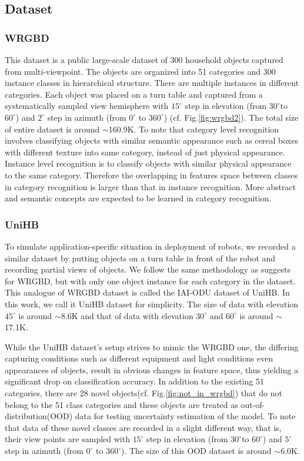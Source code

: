 \subsection{Dataset}
\subsubsection{WRGBD\cite{lai2011large}} This dataset is a public large-scale dataset of 300 household objects captured from multi-viewpoint. The objects are organized into 51 categories and 300 instance classes in hierarchical structure. There are multiple instances in different categories. Each object was placed on a turn table and captured from a systematically sampled view hemisphere with $15^{\circ}$ step in elevation (from $30^{\circ}$to $60^{\circ}$) and $2^\circ$ step in azimuth (from $0^\circ$ to $360^\circ$) (cf. Fig.\ref{fig:wrgbd2}). The total size of entire dataset is around $\sim$160.9K. To note that category level recognition involves classifying objects with similar semantic appearance such as cereal boxes with different texture into same category, instead of just physical appearance. Instance level recognition is to classify objects with similar physical appearance to the same category. Therefore the overlapping in features space between classes in category recognition is larger than that in instance recognition. More abstract and semantic concepts are expected to be learned in category recognition.  

\subsubsection{UniHB} To simulate application-specific situation in deployment of robots, we recorded a similar dataset by putting objects on a turn table in front of the robot and recording partial views of objects. We follow the same methodology as \cite{lai2011large} suggests for WRGBD, but with only one object instance for each category in the dataset. This analogue of WRGBD dataset is called the IAI-ODU dataset of UniHB. In this work, we call it UniHB dataset for simplicity. The size of data with elevation $45^\circ$ is around $\sim$8.6K and that of data with elevation $30^\circ$ and $60^\circ$ is around $\sim$17.1K.

While the UniHB dataset's setup strives to mimic the WRGBD one, the differing capturing conditions such as different equipment and light conditions even appearances of objects, result in obvious changes in feature space, thus yielding a significant drop on classification accuracy. In addition to the existing 51 categories, there are 28 novel objects(cf. Fig.\ref{fig:not_in_wrgbd}) that do not belong to the 51 class categories and these objects are treated as out-of-distribution(OOD) data for testing uncertainty estimation of the model. To note that data of these novel classes are recorded in a slight different way, that is, their view points are sampled with $15^{\circ}$ step in elevation (from $30^{\circ}$to $60^{\circ}$) and $5^\circ$ step in azimuth (from $0^\circ$ to $360^\circ$). The size of this OOD dataset is around $\sim$6.0K.

